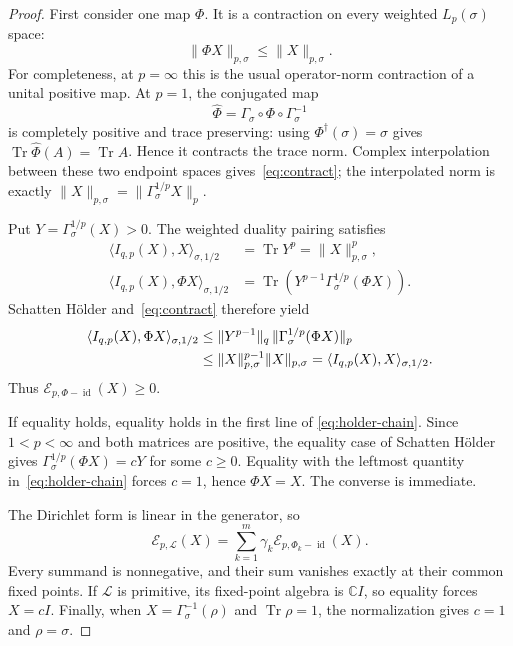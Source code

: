\documentclass[11pt]{article}
\newcommand{\Tr}{\operatorname{Tr}}
\newcommand{\id}{\operatorname{id}}
\newcommand{\cE}{\mathcal E}
\newcommand{\cL}{\mathcal L}
\newcommand{\GammaS}{\Gamma_\sigma}
\begin{document}
\begin{proof}
First consider one map $\Phi$.  It is a contraction on every weighted
$L_p(\sigma)$ space:
\begin{equation}\label{eq:contract}
 \|\Phi X\|_{p,\sigma}\le \|X\|_{p,\sigma}.
\end{equation}
For completeness, at $p=\infty$ this is the usual operator-norm contraction
of a unital positive map.  At $p=1$, the conjugated map
\[
 \widehat\Phi=\GammaS\circ\Phi\circ\GammaS^{-1}
\]
is completely positive and trace preserving: using
$\Phi^\dagger(\sigma)=\sigma$ gives
$\Tr\widehat\Phi(A)=\Tr A$.  Hence it contracts the trace norm.  Complex
interpolation between these two endpoint spaces gives~\eqref{eq:contract};
the interpolated norm is exactly
$\|X\|_{p,\sigma}=\|\GammaS^{1/p}X\|_p$.

Put $Y=\GammaS^{1/p}(X)>0$.  The weighted duality pairing satisfies
\begin{align*}
 \langle I_{q,p}(X),X\rangle_{\sigma,1/2}
 &=\Tr Y^p=\|X\|_{p,\sigma}^p,\\
 \langle I_{q,p}(X),\Phi X\rangle_{\sigma,1/2}
 &=\Tr\!\left(Y^{p-1}\GammaS^{1/p}(\Phi X)\right).
\end{align*}
Schatten H\"older and~\eqref{eq:contract} therefore yield
\begin{align}\label{eq:holder-chain}
 \langle I_{q,p}(X),\Phi X\rangle_{\sigma,1/2}
 &\le \|Y^{p-1}\|_q\,\|\GammaS^{1/p}(\Phi X)\|_p\\
 &\le \|X\|_{p,\sigma}^{p-1}\|X\|_{p,\sigma}
 =\langle I_{q,p}(X),X\rangle_{\sigma,1/2}.\notag
\end{align}
Thus $\cE_{p,\Phi-\id}(X)\ge0$.

If equality holds, equality holds in the first line of
\eqref{eq:holder-chain}.  Since $1<p<\infty$ and both matrices are positive,
the equality case of Schatten H\"older gives
$\GammaS^{1/p}(\Phi X)=cY$ for some $c\ge0$.  Equality with the leftmost
quantity in~\eqref{eq:holder-chain} forces $c=1$, hence $\Phi X=X$.
The converse is immediate.

The Dirichlet form is linear in the generator, so
\[
 \cE_{p,\cL}(X)=\sum_{k=1}^m\gamma_k
 \cE_{p,\Phi_k-\id}(X).
\]
Every summand is nonnegative, and their sum vanishes exactly at their common
fixed points.  If $\cL$ is primitive, its fixed-point algebra is
$\mathbb C I$, so equality forces $X=cI$.  Finally, when
$X=\GammaS^{-1}(\rho)$ and $\Tr\rho=1$, the normalization gives $c=1$ and
$\rho=\sigma$.
\end{proof}
\end{document}

